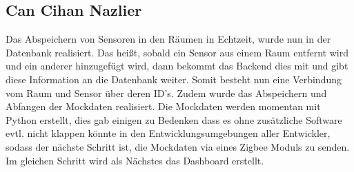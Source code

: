 \documentclass[]{article}
\begin{document}
\subsection{Can Cihan Nazlier}
Das Abspeichern von Sensoren in den Räumen in Echtzeit, wurde nun in der Datenbank realisiert. Das heißt, sobald ein Sensor aus einem Raum entfernt wird und ein anderer hinzugefügt wird, dann bekommt das Backend dies mit und gibt diese Information an die Datenbank weiter. Somit besteht nun eine Verbindung vom Raum und Sensor über deren ID's. Zudem wurde das Abspeichern und Abfangen der Mockdaten realisiert.
Die Mockdaten werden momentan mit Python erstellt, dies gab einigen zu Bedenken dass es ohne zusätzliche Software evtl. nicht klappen könnte in den Entwicklungsumgebungen
aller Entwickler, sodass der nächste Schritt ist, die Mockdaten via eines Zigbee Moduls zu senden. Im gleichen Schritt wird als Nächstes das Dashboard erstellt.

\printbibliography
\end{document}
